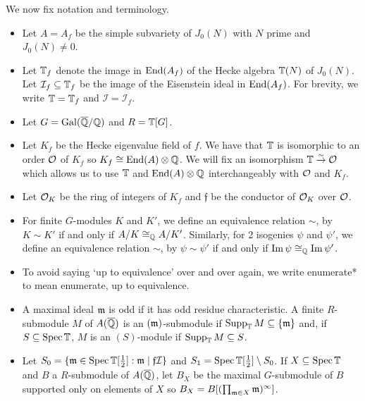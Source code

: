 \documentclass{article}
\begin{document}
We now fix notation and terminology. 
\begin{itemize}
    \item
        Let $A=A_f$ be the simple subvariety of $J_0(N)$ with $N$ prime and
        $J_0(N)\neq 0$.
    \item
        Let $\mathbb{T}_f$ denote the image in $\operatorname{End}(A_f)$ of the Hecke algebra $\mathbb{T}(N)$
        of $J_0(N)$. Let $\mathcal{I}_f\subseteq \mathbb{T}_f$ be the image of the
        Eisenstein ideal in $\operatorname{End}(A_f)$. For brevity, we write $\mathbb{T}=\mathbb{T}_f$ and
        $\mathcal{I}=\mathcal{I}_f$.
    \item
        Let $G=\operatorname{Gal}(\overline{\mathbb{Q}}/\mathbb{Q})$ and $R=\mathbb{T}[G]$.
    \item
        Let $K_f$ be the Hecke eigenvalue field of $f$. We have that $\mathbb{T}$ is
        isomorphic to an order $\mathcal{O}$ of $K_f$ so $K_f\cong \operatorname{End}(A)\otimes \mathbb{Q}$.
        We will fix an isomorphism $\mathbb{T}\overset{\sim}{\to} \mathcal{O}$ which allows us
        to use $\mathbb{T}$ and $\operatorname{End}(A)\otimes \mathbb{Q}$ interchangeably with $\mathcal{O}$ and
        $K_f$.
    \item
        Let $\mathcal{O}_K$ be the ring of integers of $K_f$ and $\mathfrak{f}$ be the
        conductor of $\mathcal{O}_K$ over $\mathcal{O}$.
    \item
        For finite $G$-modules $K$ and $K'$, we define an equivalence relation
        $\sim$, by $K\sim K'$ if and only if $A/K\cong_{\mathbb{Q}} A/K'$. Similarly,
        for 2 isogenies $\psi$ and $\psi'$, we define an equivalence relation
        $\sim$, by $\psi\sim \psi'$ if and only if $\operatorname{Im} \psi \cong_{\mathbb{Q}} \operatorname{Im}
        \psi'$.
    \item
        To avoid saying `up to equivalence' over and over again, we write
        enumerate* to mean enumerate, up to equivalence.
    \item
        A maximal ideal $\mathfrak{m}$ is odd if it has odd residue characteristic. A
        finite $R$-submodule $M$ of $A(\overline{\mathbb{Q}})$ is an $(\mathfrak{m})$-submodule if
        $\operatorname{Supp}_{\mathbb{T}} M \subseteq \{\mathfrak{m}\}$ and, if $S\subseteq \operatorname{Spec} \mathbb{T}$, $M$ is
        an $(S)$-module if $\operatorname{Supp}_{\mathbb{T}} M\subseteq S$.
    \item
        Let $S_0=\{\mathfrak{m}\in \operatorname{Spec}\mathbb{T}[\frac 12]: \mathfrak{m} \mid
        \mathfrak{f}\mathcal{I}\}$ and $S_1 = \operatorname{Spec}\mathbb{T}[\frac
        12]\setminus S_0$. If $X\subseteq \operatorname{Spec} \mathbb{T}$ and $B$ a
        $R$-submodule of $A(\overline{\mathbb{Q}})$, let $B_X$ be the maximal $G$-submodule of
        $B$ supported only on elements of $X$ so $B_X=B[(\prod_{\mathfrak{m}\in X}
        \mathfrak{m})^\infty]$.
\end{itemize}
\end{document}
